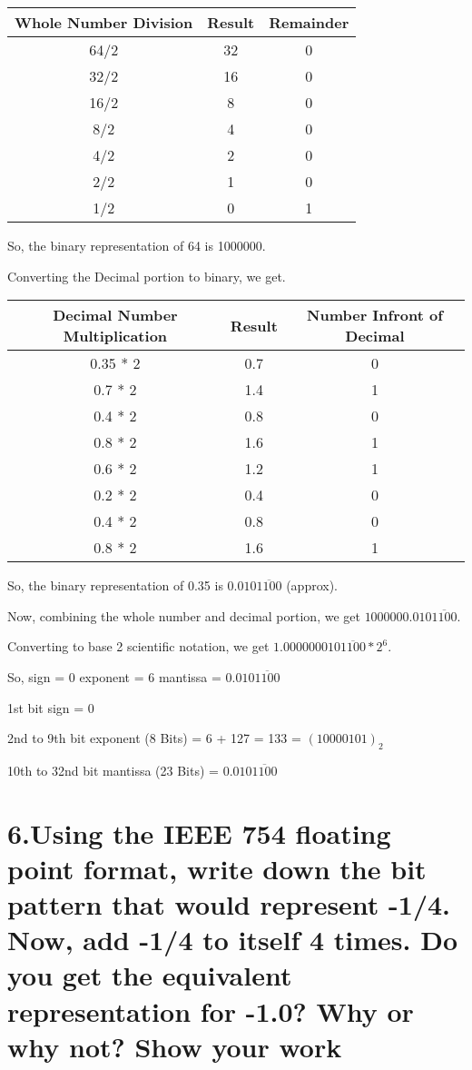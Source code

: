 \documentclass[11pt]{article}
\begin{document}
\begin{tabular}{|c|c|c|}
    \hline
    \textbf{Whole Number Division} & \textbf{Result} & \textbf{Remainder} \\
    \hline
    64/2 & 32 & 0 \\
    32/2 & 16 & 0 \\
    16/2 & 8 & 0 \\
    8/2 & 4 & 0 \\
    4/2 & 2 & 0 \\
    2/2 & 1 & 0 \\
    1/2 & 0 & 1 \\
    \hline
\end{tabular}

So, the binary representation of 64 is 1000000.

Converting the Decimal portion to binary, we get.

\begin{tabular}{|c|c|c|}
    \hline
    \textbf{Decimal Number Multiplication} & \textbf{Result} & \textbf{Number Infront of Decimal} \\
    \hline
    0.35 * 2 & 0.7 & 0 \\
    0.7 * 2 & 1.4 & 1 \\
    0.4 * 2 & 0.8 & 0 \\
    0.8 * 2 & 1.6 & 1 \\
    0.6 * 2 & 1.2 & 1 \\
    0.2 * 2 & 0.4 & 0 \\
    0.4 * 2 & 0.8 & 0 \\
    0.8 * 2 & 1.6 & 1 \\
    \hline
\end{tabular}

So, the binary representation of 0.35 is $0.010\overline{1100}$ (approx).


Now, combining the whole number and decimal portion, we get $1000000.010\overline{1100}$.

Converting to base 2 scientific notation, we get $1.000000010\overline{1100} * 2^{6}$.

So, sign = 0
exponent = 6
mantissa = $0.010\overline{1100}$

1st bit sign = 0

2nd to 9th bit exponent (8 Bits) = 6 + 127 = 133 = $(10000101)_2$

10th to 32nd bit mantissa (23 Bits) = $0.010\overline{1100}$

\newpage
\section*{6.Using the IEEE 754 floating point format, write down the bit pattern that would represent -1/4. Now, add -1/4 to itself 4 times. Do you get the equivalent representation for -1.0? Why or why not? Show your work}


\end{document}
